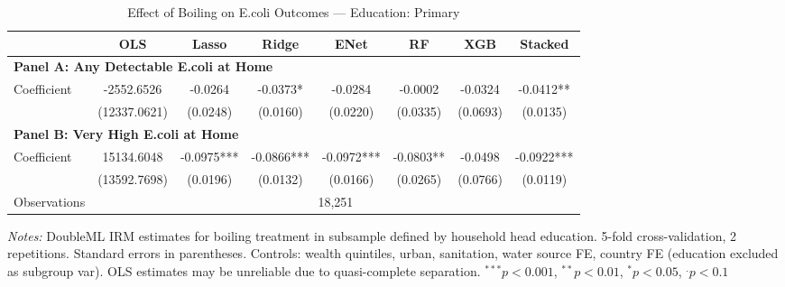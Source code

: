 \begin{table}[htbp]
\centering
\caption{Effect of Boiling on E.coli Outcomes --- Education: Primary}
\label{tab:cate_edu1}
\begin{tabular}{lccccccc}
\toprule
 & OLS & Lasso & Ridge & ENet & RF & XGB & Stacked \\
\midrule
\multicolumn{8}{l}{\textbf{Panel A: Any Detectable E.coli at Home}} \\
\midrule
Coefficient & -2552.6526 & -0.0264 & -0.0373* & -0.0284 & -0.0002 & -0.0324 & -0.0412** \\
 & (12337.0621) & (0.0248) & (0.0160) & (0.0220) & (0.0335) & (0.0693) & (0.0135) \\

\multicolumn{8}{l}{\textbf{Panel B: Very High E.coli at Home}} \\
\midrule
Coefficient & 15134.6048 & -0.0975*** & -0.0866*** & -0.0972*** & -0.0803** & -0.0498 & -0.0922*** \\
 & (13592.7698) & (0.0196) & (0.0132) & (0.0166) & (0.0265) & (0.0766) & (0.0119) \\

\midrule
Observations & \multicolumn{7}{c}{18,251} \\
\bottomrule
\end{tabular}
\begin{minipage}{\textwidth}
\footnotesize
\textit{Notes:} DoubleML IRM estimates for boiling treatment in subsample defined by household head education. 
5-fold cross-validation, 2 repetitions. Standard errors in parentheses. 
Controls: wealth quintiles, urban, sanitation, water source FE, country FE (education excluded as subgroup var). 
OLS estimates may be unreliable due to quasi-complete separation. 
$^{***}p<0.001$, $^{**}p<0.01$, $^{*}p<0.05$, $^{.}p<0.1$
\end{minipage}
\end{table}
